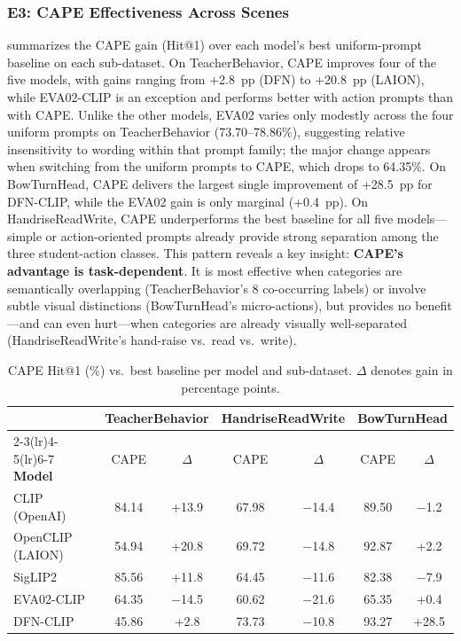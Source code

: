 \documentclass[symmetry,article,submit,pdftex,moreauthors]{Definitions/mdpi}
\begin{document}
\subsubsection{E3: CAPE Effectiveness Across Scenes}
\label{sec:e3}

 summarizes the CAPE gain (Hit@1) over each model's best uniform-prompt baseline on each sub-dataset.
On TeacherBehavior, CAPE improves four of the five models, with gains ranging from +2.8~pp (DFN) to +20.8~pp (LAION), while EVA02-CLIP is an exception and performs better with action prompts than with CAPE. Unlike the other models, EVA02 varies only modestly across the four uniform prompts on TeacherBehavior (73.70--78.86\%), suggesting relative insensitivity to wording within that prompt family; the major change appears when switching from the uniform prompts to CAPE, which drops to 64.35\%.
On BowTurnHead, CAPE delivers the largest single improvement of +28.5~pp for DFN-CLIP, while the EVA02 gain is only marginal (+0.4~pp).
On HandriseReadWrite, CAPE underperforms the best baseline for all five models---simple or action-oriented prompts already provide strong separation among the three student-action classes.
This pattern reveals a key insight: \textbf{CAPE's advantage is task-dependent}. It is most effective when categories are semantically overlapping (TeacherBehavior's 8 co-occurring labels) or involve subtle visual distinctions (BowTurnHead's micro-actions), but provides no benefit---and can even hurt---when categories are already visually well-separated (HandriseReadWrite's hand-raise vs.\ read vs.\ write).

\begin{table}[H]
\caption{CAPE Hit@1 (\%) vs.\ best baseline per model and sub-dataset. $\Delta$ denotes gain in percentage points.}
\label{tab:cape_gain}
\centering
\small
\setlength{\tabcolsep}{3pt}
\begin{tabular}{l cc cc cc}
\toprule
 & \multicolumn{2}{c}{\textbf{TeacherBehavior}} & \multicolumn{2}{c}{\textbf{HandriseReadWrite}} & \multicolumn{2}{c}{\textbf{BowTurnHead}} \\
\cmidrule(lr){2-3}\cmidrule(lr){4-5}\cmidrule(lr){6-7}
\textbf{Model} & CAPE & $\Delta$ & CAPE & $\Delta$ & CAPE & $\Delta$ \\
\midrule
CLIP (OpenAI) & 84.14 & +13.9 & 67.98 & $-$14.4 & 89.50 & $-$1.2 \\
OpenCLIP (LAION) & 54.94 & +20.8 & 69.72 & $-$14.8 & 92.87 & +2.2 \\
SigLIP2 & 85.56 & +11.8 & 64.45 & $-$11.6 & 82.38 & $-$7.9 \\
EVA02-CLIP & 64.35 & $-$14.5 & 60.62 & $-$21.6 & 65.35 & +0.4 \\
DFN-CLIP & 45.86 & +2.8 & 73.73 & $-$10.8 & 93.27 & +28.5 \\
\bottomrule
\end{tabular}
\end{table}
\end{document}
